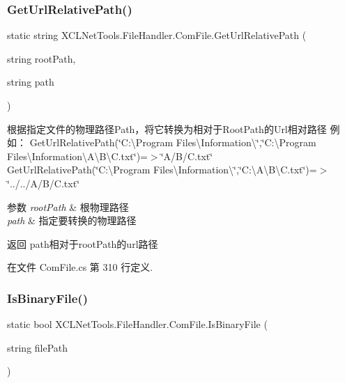 \subsubsection{\texorpdfstring{Get\+Url\+Relative\+Path()}{GetUrlRelativePath()}}
{\footnotesize\ttfamily static string X\+C\+L\+Net\+Tools.\+File\+Handler.\+Com\+File.\+Get\+Url\+Relative\+Path (\begin{DoxyParamCaption}\item[{string}]{root\+Path,  }\item[{string}]{path }\end{DoxyParamCaption})\hspace{0.3cm}{\ttfamily [static]}}



根据指定文件的物理路径\+Path，将它转换为相对于\+Root\+Path的\+Url相对路径 例如： Get\+Url\+Relative\+Path(\char`\"{}\+C\+:\textbackslash{}\+Program Files\textbackslash{}\+Information\textbackslash{}\char`\"{},\char`\"{}\+C\+:\textbackslash{}\+Program Files\textbackslash{}\+Information\textbackslash{}\+A\textbackslash{}\+B\textbackslash{}\+C.\+txt\char`\"{})=$>$\char`\"{}\+A/\+B/\+C.\+txt\char`\"{} Get\+Url\+Relative\+Path(\char`\"{}\+C\+:\textbackslash{}\+Program Files\textbackslash{}\+Information\textbackslash{}\char`\"{},\char`\"{}\+C\+:\textbackslash{}\+A\textbackslash{}\+B\textbackslash{}\+C.\+txt\char`\"{})=$>$\char`\"{}../../\+A/\+B/\+C.\+txt\char`\"{} 


\begin{DoxyParams}{参数}
{\em root\+Path} & 根物理路径\\
\hline
{\em path} & 指定要转换的物理路径\\
\hline
\end{DoxyParams}
\begin{DoxyReturn}{返回}
path相对于root\+Path的url路径
\end{DoxyReturn}


在文件 Com\+File.\+cs 第 310 行定义.

\mbox{\label{class_x_c_l_net_tools_1_1_file_handler_1_1_com_file_a9e413978309f59720a38228ad9c1aaa2}} 
\subsubsection{\texorpdfstring{Is\+Binary\+File()}{IsBinaryFile()}}
{\footnotesize\ttfamily static bool X\+C\+L\+Net\+Tools.\+File\+Handler.\+Com\+File.\+Is\+Binary\+File (\begin{DoxyParamCaption}\item[{string}]{file\+Path }\end{DoxyParamCaption})\hspace{0.3cm}{\ttfamily [static]}}



